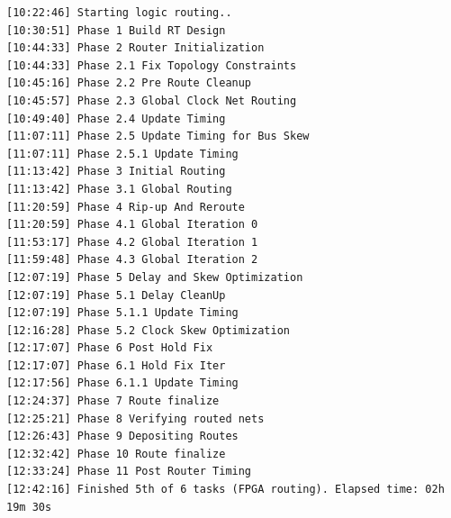 \begin{lstlisting}
[10:22:46] Starting logic routing..
[10:30:51] Phase 1 Build RT Design
[10:44:33] Phase 2 Router Initialization
[10:44:33] Phase 2.1 Fix Topology Constraints
[10:45:16] Phase 2.2 Pre Route Cleanup
[10:45:57] Phase 2.3 Global Clock Net Routing
[10:49:40] Phase 2.4 Update Timing
[11:07:11] Phase 2.5 Update Timing for Bus Skew
[11:07:11] Phase 2.5.1 Update Timing
[11:13:42] Phase 3 Initial Routing
[11:13:42] Phase 3.1 Global Routing
[11:20:59] Phase 4 Rip-up And Reroute
[11:20:59] Phase 4.1 Global Iteration 0
[11:53:17] Phase 4.2 Global Iteration 1
[11:59:48] Phase 4.3 Global Iteration 2
[12:07:19] Phase 5 Delay and Skew Optimization
[12:07:19] Phase 5.1 Delay CleanUp
[12:07:19] Phase 5.1.1 Update Timing
[12:16:28] Phase 5.2 Clock Skew Optimization
[12:17:07] Phase 6 Post Hold Fix
[12:17:07] Phase 6.1 Hold Fix Iter
[12:17:56] Phase 6.1.1 Update Timing
[12:24:37] Phase 7 Route finalize
[12:25:21] Phase 8 Verifying routed nets
[12:26:43] Phase 9 Depositing Routes
[12:32:42] Phase 10 Route finalize
[12:33:24] Phase 11 Post Router Timing
[12:42:16] Finished 5th of 6 tasks (FPGA routing). Elapsed time: 02h 19m 30s 


\end{lstlisting}
